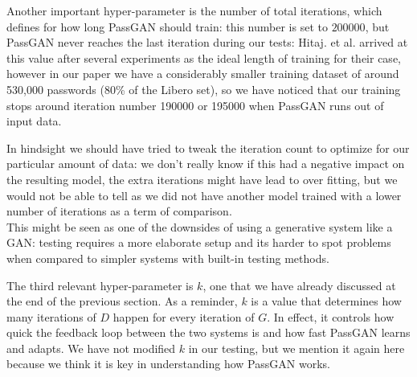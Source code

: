 Another important hyper-parameter is the number of total iterations, which defines for how long PassGAN should train: this number is set to $200000$, but PassGAN never reaches the last iteration during our tests: Hitaj. et al. arrived at this value after several experiments as the ideal length of training for their case, however in our paper we have a considerably smaller training dataset of around 530,000 passwords (80\% of the Libero set), so we have noticed that our training stops around iteration number 190000 or 195000 when PassGAN runs out of input data.

In hindsight we should have tried to tweak the iteration count to optimize for our particular amount of data: we don't really know if this had a negative impact on the resulting model, the extra iterations might have lead to over fitting, but we would not be able to tell as we did not have another model trained with a lower number of iterations as a term of comparison.\\
This might be seen as one of the downsides of using a generative system like a GAN: testing requires a more elaborate setup and its harder to spot problems when compared to simpler systems with built-in testing methods. 

The third relevant hyper-parameter is $k$, one that we have already discussed at the end of the previous section. As a reminder, $k$ is a value that determines how many iterations of $D$ happen for every iteration of $G$. In effect, it controls how quick the feedback loop between the two systems is and how fast PassGAN learns and adapts. We have not modified $k$ in our testing, but we mention it again here because we think it is key in understanding how PassGAN works. 

